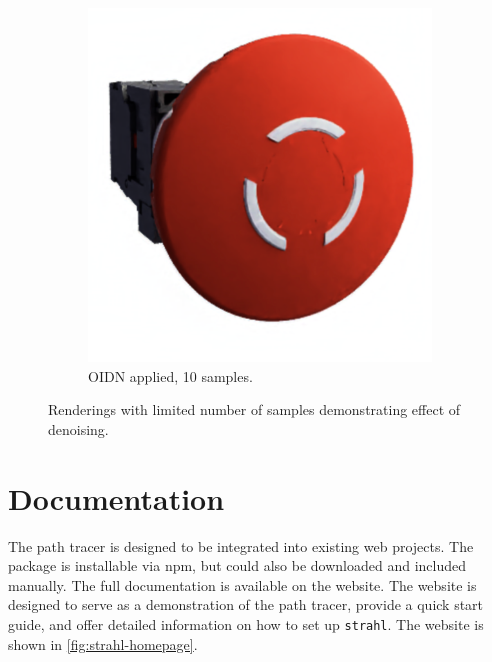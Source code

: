 \begin{figure}[H]
\begin{subfigure}[t]{0.4\textwidth}
        \includegraphics[width=\textwidth]{resources/denoise-oidn-10-samples.png}
        \caption{\gls{OIDN} applied, 10 samples.}
        \label{fig:denoise-oidn-10-samples}
    \end{subfigure}
    \hspace*{0.8cm}
    \caption{Renderings with limited number of samples demonstrating effect of denoising.}
    \label{fig:denoise-samples}
\end{figure}

\section{Documentation}

The path tracer is designed to be integrated into existing web projects. The package is installable via \gls{npm}, but could also be downloaded and included manually. The full documentation is available on the website. The website is designed to serve as a demonstration of the path tracer, provide a quick start guide, and offer detailed information on how to set up \texttt{strahl}. The website is shown in \autoref{fig:strahl-homepage}.

